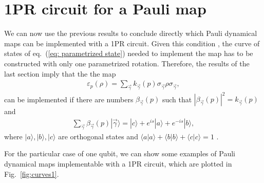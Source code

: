 \documentclass[10pt,letterpaper]{article} %
\newcommand{\fref}[1]{Fig.~\ref{#1}}
\newcommand{\eref}[1]{eq.~(\ref{#1})}
\begin{document}
\section{1PR circuit for a Pauli map} %
\label{sec: 1PR circuit for a Pauli map}

We can now use the previous results to conclude directly which Pauli dynamical maps
can be implemented with a 1PR circuit.
Given this condition , the curve of states of \eref{eq: parametrized state}  needed 
to implement the map
has to be constructed with only one parametrized rotation. 
Therefore, the results of the last section imply that the the map
\begin{eqnarray}
\varepsilon_p(\rho) = \sum_{\vec{\gamma}} k_{\vec{\gamma}}(p) \sigma_{\vec{\gamma}} \rho \sigma_{\vec{\gamma}},
\end{eqnarray}
can be implemented  if there are numbers $\beta_{\vec{\gamma}}(p)$ such that $|\beta_{\vec{\gamma}}(p)|^2 = k_{\vec{\gamma}}(p)$ and
\begin{eqnarray}
\label{eq:vec}
\sum_{\vec{\gamma}} \beta_{\vec{\gamma}}(p) |\vec{\gamma}\rangle = |c\rangle +  e^{is} |a\rangle + e^{-is}|b\rangle,
\end{eqnarray}
where $|a\rangle,|b\rangle,|c\rangle$ are orthogonal states  
and $\langle a| a\rangle + \langle b| b\rangle + \langle c| c\rangle = 1$ .

For the particular case of one qubit,
we can show some examples of Pauli dynamical maps
implementable with a 1PR circuit, which are plotted
in \fref{fig:curves1}.
\end{document}
